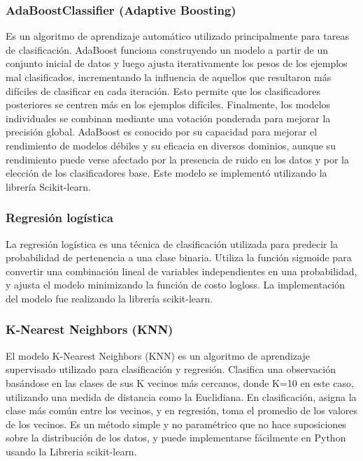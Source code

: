 \documentclass[
  number,
  preprint,
  3p,
  twocolumn]{elsarticle}
\begin{document}
\subsubsection{AdaBoostClassifier (Adaptive
Boosting)}\label{adaboostclassifier-adaptive-boosting}

Es un algoritmo de aprendizaje automático utilizado principalmente para
tareas de clasificación. AdaBoost funciona construyendo un modelo a
partir de un conjunto inicial de datos y luego ajusta iterativamente los
pesos de los ejemplos mal clasificados, incrementando la influencia de
aquellos que resultaron más difíciles de clasificar en cada iteración.
Esto permite que los clasificadores posteriores se centren más en los
ejemplos difíciles. Finalmente, los modelos individuales se combinan
mediante una votación ponderada para mejorar la precisión global.
AdaBoost es conocido por su capacidad para mejorar el rendimiento de
modelos débiles y su eficacia en diversos dominios, aunque su
rendimiento puede verse afectado por la presencia de ruido en los datos
y por la elección de los clasificadores base. Este modelo se implementó
utilizando la librería Scikit-learn.

\subsubsection{Regresión logística}\label{regresiuxf3n-loguxedstica}

La regresión logística es una técnica de clasificación utilizada para
predecir la probabilidad de pertenencia a una clase binaria. Utiliza la
función sigmoide para convertir una combinación lineal de variables
independientes en una probabilidad, y ajusta el modelo minimizando la
función de costo logloss. La implementación del modelo fue realizando la
librería scikit-learn.

\subsubsection{K-Nearest Neighbors (KNN)}\label{k-nearest-neighbors-knn}

El modelo K-Nearest Neighbors (KNN) es un algoritmo de aprendizaje
supervisado utilizado para clasificación y regresión. Clasifica una
observación basándose en las clases de sus K vecinos más cercanos, donde
K=10 en este caso, utilizando una medida de distancia como la
Euclidiana. En clasificación, asigna la clase más común entre los
vecinos, y en regresión, toma el promedio de los valores de los vecinos.
Es un método simple y no paramétrico que no hace suposiciones sobre la
distribución de los datos, y puede implementarse fácilmente en Python
usando la Libreria scikit-learn.
\end{document}
